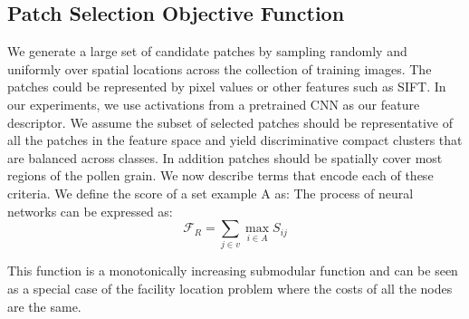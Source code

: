 \documentclass[10pt,twocolumn,letterpaper]{article}
\begin{document}
\subsection{Patch Selection Objective Function}
\par
We generate a large set of candidate patches by sampling randomly and uniformly over spatial locations across the collection of training images. The patches could be represented by pixel values or other features such as SIFT. In our experiments, we use activations from a pretrained CNN as our feature descriptor. We assume the subset of selected patches should be representative of all the patches in the feature space and yield discriminative compact clusters that are balanced across classes. In addition patches should be spatially cover most regions of the pollen grain. We now describe terms that encode each of these criteria. We define the score  of a set example A as:
The process of neural networks can be expressed as:
\begin{equation}\mathcal{F}_{R}=\sum_{j \in v}\max\limits_{i \in A} S_{ij}\end{equation}

This function is a monotonically increasing submodular function and can be seen as a special case of the facility location problem  where the costs of all the nodes are the same.
{\small


}
\end{document}
